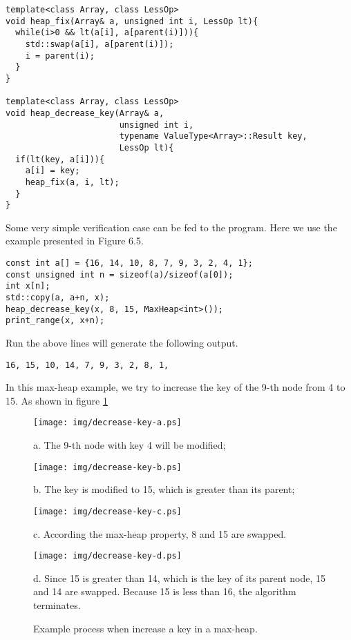\documentclass{article}
\begin{document}
\lstset{language=C++}
\begin{lstlisting}
template<class Array, class LessOp>
void heap_fix(Array& a, unsigned int i, LessOp lt){
  while(i>0 && lt(a[i], a[parent(i)])){
    std::swap(a[i], a[parent(i)]);
    i = parent(i);
  }
}

template<class Array, class LessOp>
void heap_decrease_key(Array& a,
                       unsigned int i,
                       typename ValueType<Array>::Result key,
                       LessOp lt){
  if(lt(key, a[i])){
    a[i] = key;
    heap_fix(a, i, lt);
  }
}
\end{lstlisting}

Some very simple verification case can be fed to the program.
Here we use the example presented in \cite{CLRS} Figure 6.5.

\begin{lstlisting}
const int a[] = {16, 14, 10, 8, 7, 9, 3, 2, 4, 1};
const unsigned int n = sizeof(a)/sizeof(a[0]);
int x[n];
std::copy(a, a+n, x);
heap_decrease_key(x, 8, 15, MaxHeap<int>());
print_range(x, x+n);
\end{lstlisting}

Run the above lines will generate the following output.
\begin{verbatim}
16, 15, 10, 14, 7, 9, 3, 2, 8, 1,
\end{verbatim}

In this max-heap example, we try to increase the key of the 9-th node from
4 to 15. As shown in figure \ref{fig:decrease-key}

\begin{figure}[htbp]
  \begin{center}
    \texttt{[image: img/decrease-key-a.ps]}

    a. The 9-th node with key 4 will be modified;

    \texttt{[image: img/decrease-key-b.ps]}

    b. The key is modified to 15, which is greater than its parent;

    \texttt{[image: img/decrease-key-c.ps]}

    c. According the max-heap property, 8 and 15 are swapped.

    \texttt{[image: img/decrease-key-d.ps]}

    d. Since 15 is greater than 14, which is the key of its parent node, 15 and 14 are swapped. Because 15 is less than 16, the algorithm terminates.

    \caption{Example process when increase a key in a max-heap.} \label{fig:decrease-key}
  \end{center}
\end{figure}
\end{document}
